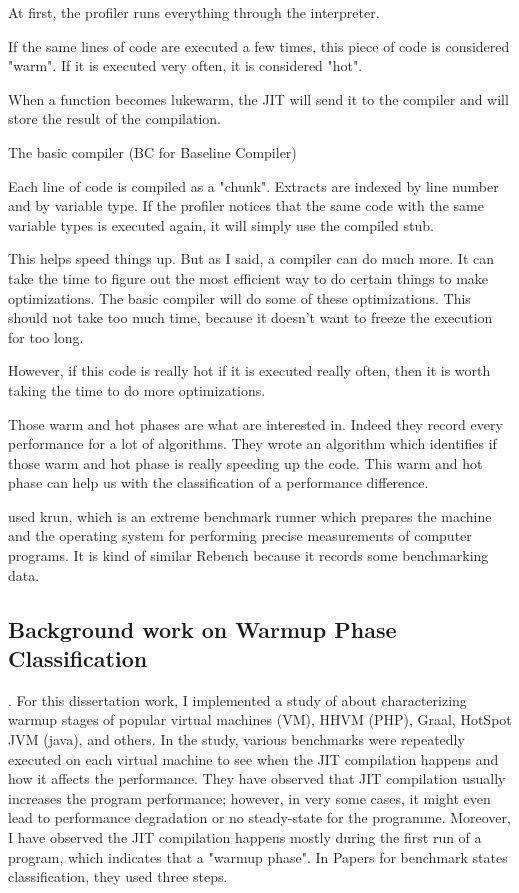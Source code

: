 \documentclass{article}
\begin{document}
At first, the profiler runs everything through the interpreter.

If the same lines of code are executed a few times, this piece of code is considered "warm". If it is executed very often, it is considered "hot".

When a function becomes lukewarm, the JIT will send it to the compiler and will store the result of the compilation.

The basic compiler (BC for Baseline Compiler)

Each line of code is compiled as a "chunk". Extracts are indexed by line number and by variable type. If the profiler notices that the same code with the same variable types is executed again, it will simply use the compiled stub.

This helps speed things up. But as I said, a compiler can do much more. It can take the time to figure out the most efficient way to do certain things to make optimizations. The basic compiler will do some of these optimizations. This should not take too much time, because it doesn't want to freeze the execution for too long.

However, if this code is really hot if it is executed really often, then it is worth taking the time to do more optimizations.

Those warm and hot phases are what \cite{barrett2017virtual} are interested in. Indeed they record every performance for a lot of algorithms. They wrote an algorithm which identifies if those warm and hot phase is really speeding up the code. This warm and hot phase can help us with the classification of a performance difference.

\cite{barrett2017virtual} used krun, which is an extreme benchmark runner which prepares the machine and the operating system for performing precise measurements of computer programs. It is kind of similar Rebench because it records some benchmarking data.

\subsection{Background work on Warmup Phase Classification}

.
For this dissertation work, I implemented a study of \cite{barrett2017virtual} about characterizing warmup stages of popular virtual machines (VM), HHVM (PHP), Graal, HotSpot JVM (java), and others. 
In the study, various benchmarks were repeatedly executed on each virtual machine to see when the JIT compilation happens and how it affects the performance.
They have observed that JIT compilation usually increases the program performance; however, in very some cases, it might even lead to performance degradation or no steady-state for the programme. Moreover, I have observed the JIT compilation happens mostly during the first run of a program, which indicates that a "warmup phase".
In \cite{barrett2017virtual} Papers for benchmark states classification, they used three steps.
\end{document}
